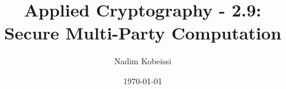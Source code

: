 \ifdefined\PRESENTATION\else\PassOptionsToClass{handout}{beamer}\fi\documentclass[aspectratio=169, lualatex]{beamer}
\title{Applied Cryptography - 2.9: Secure Multi-Party Computation}
\author{Nadim Kobeissi}
\institute{Symbolic Software}
\date{\today}
\begin{document}
\begin{frame}[plain]
	\titlepage
\end{frame}

\incompleteslideswarning

\begin{frame}[plain]
	\titlepage
\end{frame}
\end{document}
